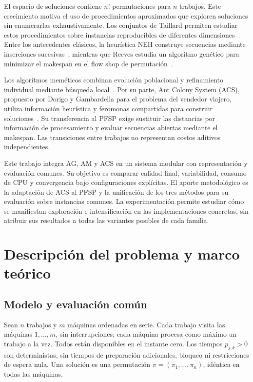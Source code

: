 \documentclass[journal]{IEEEtran}
\begin{document}
El espacio de soluciones contiene $n!$ permutaciones para $n$ trabajos. Este crecimiento motiva el uso de procedimientos aproximados que exploren soluciones sin enumerarlas exhaustivamente. Los conjuntos de Taillard permiten estudiar estos procedimientos sobre instancias reproducibles de diferentes dimensiones~\cite{Taillard1993}. Entre los antecedentes clásicos, la heurística NEH construye secuencias mediante inserciones sucesivas~\cite{Nawaz1983}, mientras que Reeves estudia un algoritmo genético para minimizar el makespan en el flow shop de permutación~\cite{Reeves1995}.

Los algoritmos meméticos combinan evolución poblacional y refinamiento individual mediante búsqueda local~\cite{Krasnogor2005}. Por su parte, Ant Colony System (ACS), propuesto por Dorigo y Gambardella para el problema del vendedor viajero, utiliza información heurística y feromonas compartidas para construir soluciones~\cite{Dorigo1997}. Su transferencia al PFSP exige sustituir las distancias por información de procesamiento y evaluar secuencias abiertas mediante el makespan. Las transiciones entre trabajos no representan costos aditivos independientes.

Este trabajo integra AG, AM y ACS en un sistema modular con representación y evaluación comunes. Su objetivo es comparar calidad final, variabilidad, consumo de CPU y convergencia bajo configuraciones explícitas. El aporte metodológico es la adaptación de ACS al PFSP y la unificación de los tres métodos para su evaluación sobre instancias comunes. La experimentación permite estudiar cómo se manifiestan exploración e intensificación en las implementaciones concretas, sin atribuir sus resultados a todas las variantes posibles de cada familia.

\section{Descripción del problema y marco teórico}
\label{sec:problema}
\subsection{Modelo y evaluación común}
Sean $n$ trabajos y $m$ máquinas ordenadas en serie. Cada trabajo visita las máquinas $1,\ldots,m$, sin interrupciones; cada máquina procesa como máximo un trabajo a la vez. Todos están disponibles en el instante cero. Los tiempos $p_{j,k}>0$ son deterministas, sin tiempos de preparación adicionales, bloqueo ni restricciones de espera nula. Una solución es una permutación $\pi=(\pi_1,\ldots,\pi_n)$, idéntica en todas las máquinas.
\end{document}
